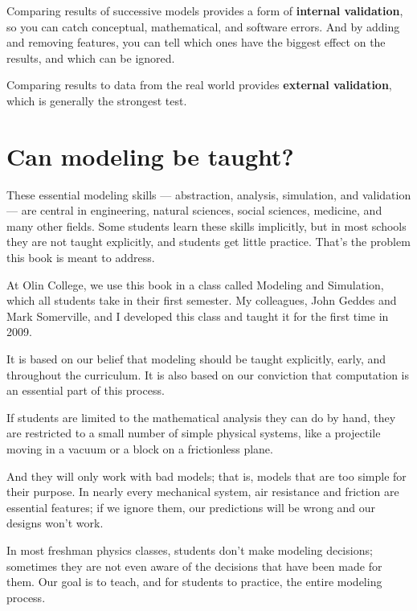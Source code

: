 \documentclass[12pt]{book}
\theoremstyle{exercise}
\begin{document}
Comparing results of successive models provides a form of {\bf internal validation}, so you can catch conceptual, mathematical, and software errors.  And by adding and removing features, you can tell which ones have the biggest effect on the results, and which can be ignored.


Comparing results to data from the real world provides {\bf external validation}, which is generally the strongest test.


\section*{Can modeling be taught?}

These essential modeling skills --- abstraction, analysis, simulation, and validation --- are central in engineering, natural sciences, social sciences, medicine, and many other fields.  Some students learn these skills implicitly, but in most schools they are not taught explicitly, and students get little practice.  That's the problem this book is meant to address.  

At Olin College, we use this book in a class called Modeling and Simulation, which all students take in their first semester.  My colleagues, John Geddes and Mark Somerville, and I developed this class and taught it for the first time in 2009.

It is based on our belief that modeling should be taught explicitly, early, and throughout the curriculum.  It is also based on our conviction that computation is an essential part of this process.

If students are limited to the mathematical analysis they can do by hand, they are restricted to a small number of simple physical systems, like a projectile moving in a vacuum or a block on a frictionless plane.

And they will only work with bad models; that is, models that are too simple for their purpose.  In nearly every mechanical system, air resistance and friction are essential features; if we ignore them, our predictions will be wrong and our designs won't work.

In most freshman physics classes, students don't make modeling decisions; sometimes they are not even aware of the decisions that have been made for them.  Our goal is to teach, and for students to practice, the entire modeling process.
\end{document}
